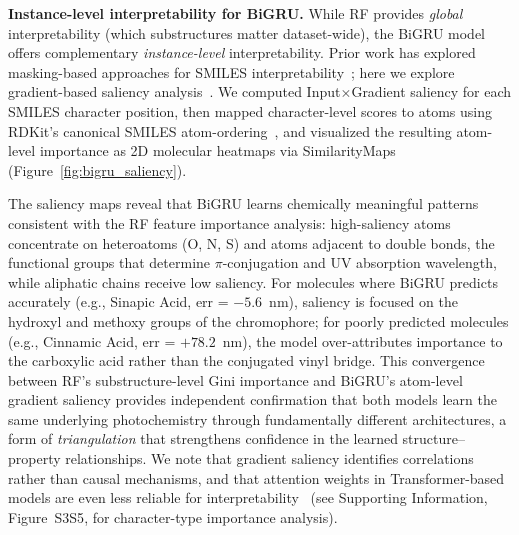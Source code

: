 \documentclass[journal=jcisd8,manuscript=article]{achemso}
\newcommand{\added}[1]{{\color{addedblue}#1}}
\newcommand{\removed}[1]{{\color{removedred}#1}}
\begin{document}
\textbf{Instance-level interpretability for BiGRU.}
While RF provides \emph{global} interpretability (which substructures matter dataset-wide), the BiGRU model offers complementary \emph{instance-level} interpretability.
Prior work has explored masking-based approaches for SMILES interpretability~\cite{gohSMILES2VecInterpretableGeneralPurpose2018}; here we explore gradient-based saliency analysis~\cite{simonyan2014deep}.
We computed Input$\times$Gradient saliency for each SMILES character position, then mapped character-level scores to atoms using RDKit's canonical SMILES atom-ordering~\cite{landrumRdkitRdkit2020_03_12020}, and visualized the resulting atom-level importance as 2D molecular heatmaps via SimilarityMaps~\cite{riniker2013similarity} (Figure~\ref{fig:bigru_saliency}).

The saliency maps reveal that BiGRU learns chemically meaningful patterns consistent with the RF feature importance analysis: high-saliency atoms concentrate on heteroatoms (O, N, S) and atoms adjacent to double bonds, the functional groups that determine $\pi$-conjugation and UV absorption wavelength, while aliphatic chains receive low saliency.
For molecules where BiGRU predicts accurately (e.g., Sinapic Acid, err = $-5.6$~nm), saliency is focused on the hydroxyl and methoxy groups of the chromophore; for poorly predicted molecules (e.g., Cinnamic Acid, err = $+78.2$~nm), the model over-attributes importance to the carboxylic acid rather than the conjugated vinyl bridge.
This convergence between RF's substructure-level Gini importance and BiGRU's atom-level gradient saliency provides independent confirmation that both models learn the same underlying photochemistry through fundamentally different architectures, a form of \emph{triangulation} that strengthens confidence in the learned structure--property relationships.
We note that gradient saliency identifies correlations rather than causal mechanisms, and that attention weights in Transformer-based models are even less reliable for interpretability~\cite{jain2019attention} (see Supporting Information, Figure~\removed{S3}\added{S5}, for character-type importance analysis).
\end{document}
